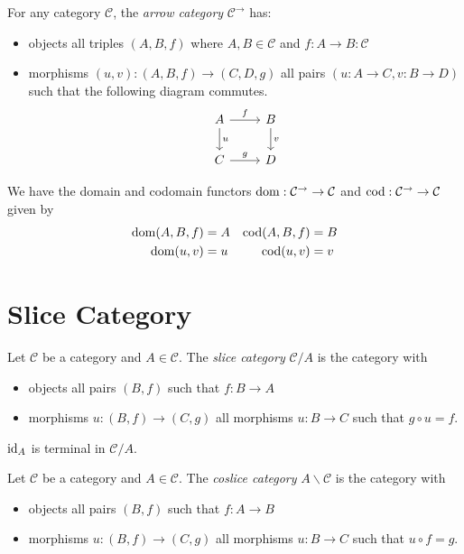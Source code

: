 \begin{df}
For any category $\mathcal{C}$, the \emph{arrow category} $\mathcal{C}^\rightarrow$ has:
\begin{itemize}
\item objects all triples $(A,B,f)$ where $A,B \in \mathcal{C}$ and $f : A \rightarrow B : \mathcal{C}$
\item morphisms $(u,v) : (A,B,f) \rightarrow (C,D,g)$ all pairs $(u : A \rightarrow C, v : B \rightarrow D)$ such that the following diagram commutes.
\[ \begin{tikzcd}
A \arrow[r,"f"] \arrow[d,"u"] & B \arrow[d,"v"] \\
C \arrow[r,"g"] & D
\end{tikzcd} \]
\end{itemize}

We have the domain and codomain functors $\operatorname{dom} : \mathcal{C}^\rightarrow \rightarrow \mathcal{C}$ and $\operatorname{cod} : \mathcal{C}^\rightarrow \rightarrow \mathcal{C}$ given by
\begin{align*}
\operatorname{dom} (A,B,f) & = A & \operatorname{cod} (A,B,f) & = B \\
\operatorname{dom}(u,v) & = u & \operatorname{cod} (u,v) & = v
\end{align*}
\end{df}

\section{Slice Category}

\begin{df}
Let $\mathcal{C}$ be a category and $A \in \mathcal{C}$. The \emph{slice category} $\mathcal{C} / A$ is the category with
\begin{itemize}
\item objects all pairs $(B,f)$ such that $f : B \rightarrow A$
\item morphisms $u : (B,f) \rightarrow (C,g)$ all morphisms $u : B \rightarrow C$ such that $g \circ u = f$.
\end{itemize}
\end{df}

\begin{ex}
$\mathrm{id}_{A}$ is terminal in $\mathcal{C} / A$.
\end{ex}

\begin{df}
Let $\mathcal{C}$ be a category and $A \in \mathcal{C}$. The \emph{coslice category} $A \backslash \mathcal{C}$ is the category with
\begin{itemize}
\item objects all pairs $(B,f)$ such that $f : A \rightarrow B$
\item morphisms $u : (B,f) \rightarrow (C,g)$ all morphisms $u : B \rightarrow C$ such that $u \circ f = g$.
\end{itemize}
\end{df}

